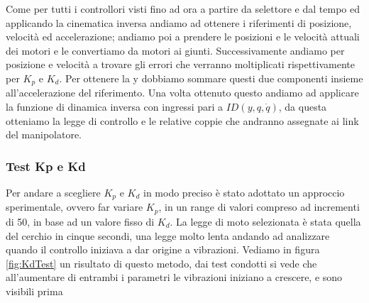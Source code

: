 Come per tutti i controllori visti fino ad ora a partire da selettore e dal tempo ed applicando la cinematica inversa  andiamo ad ottenere i riferimenti di posizione,  velocità ed accelerazione; andiamo poi a prendere le posizioni e le velocità attuali dei motori e le convertiamo da motori ai giunti. Successivamente andiamo per posizione e velocità a trovare gli errori che verranno moltiplicati rispettivamente per $K_p$ e $K_d$. Per ottenere la y dobbiamo sommare questi due componenti insieme all'accelerazione del riferimento. Una volta ottenuto questo andiamo ad applicare la funzione di dinamica inversa con ingressi pari a $ID(y,q,\dot{q})$, da questa otteniamo la legge di controllo e le relative coppie che andranno assegnate ai link del manipolatore. 
\subsubsection*{Test Kp e Kd}
Per andare a scegliere $K_p$ e $K_d$ in modo preciso è stato adottato un approccio sperimentale, ovvero far variare $K_p$, in un range di valori compreso ad incrementi di 50, in base ad un valore fisso di $K_d$. La legge di moto selezionata è stata quella del cerchio in cinque secondi, una legge molto lenta andando ad analizzare quando il controllo iniziava a dar origine a vibrazioni. Vediamo in figura \ref{fig:KdTest} un risultato di questo metodo, dai test condotti si vede che all'aumentare di entrambi i parametri le vibrazioni iniziano a crescere, e sono visibili prima  
